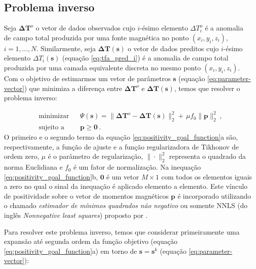 \subsection{Problema inverso}
\label{subsec:mag_dir_prob_inv}

Seja $\mathbf{\Delta T}^{o}$ o vetor de dados observados cujo $i$-ésimo elemento $\Delta T_{i}^{o}$ é a anomalia de campo total produzida por uma fonte magnética no ponto $(x_{i},y_{i},z_{i})$, $i = 1, \dots, N$. Similarmente, seja $\mathbf{\Delta T} (\mathbf{s})$ o vetor de dados preditos cujo $i$-ésimo elemento $\Delta T_{i}(\mathbf{s})$ (equação \ref{eq:tfa_pred_i}) é a anomalia de campo total produzida por uma camada equivalente discreta no mesmo ponto $(x_{i},y_{i},z_{i})$. Com o objetivo de estimarmos um vetor de parâmetros $\mathbf{s}$ (equação \ref{eq:parameter-vector}) que minimiza a diferença entre $\mathbf{\Delta T}^{o}$ e $\mathbf{\Delta T}(\mathbf{s})$, temos que resolver o problema inverso:

\begin{subequations}
	\begin{align}
	& \text{minimizar}
	& &\Psi(\mathbf{s}) =\lVert \mathbf{\Delta T}^{o} - \mathbf{\Delta T} (\mathbf{s}) 
	\rVert_{2}^{2} + \, \mu f_0 \parallel \mathbf{p} \parallel_{2}^{2} \: , \\
	& \text{sujeito a}
	& & \mathbf{p} \geqslant \mathbf{0} \: .
	\end{align}
	\label{eq:positivity_goal_function}
\end{subequations}
O primeiro e o segundo termo da equação \ref{eq:positivity_goal_function}a são, respectivamente, a função de ajuste e a função 
regularizadora de Tikhonov de ordem zero, $\mu$ é o parâmetro de regularização, $\| \cdot \|_{2}^{2}$ representa o quadrado da 
norma Euclidiana e $f_{0}$ é um fator de normalização. Na inequação \ref{eq:positivity_goal_function}b, $\mathbf{0}$ é um vetor 
$M \times 1$ com todos os elementos iguais a zero no qual o sinal da inequação é aplicado elemento a elemento. 
Este vínculo de positividade sobre o vetor de momentos magnéticos $\mathbf{p}$ é incorporado utilizando o chamado 
\textit{estimador de mínimos quadrados não negativo} ou somente NNLS (do inglês \textit{Nonnegative least squares}) proposto 
por \cite{lawson_hanson_1974}.

Para resolver este problema inverso, temos que considerar primeiramente uma expansão até segunda ordem da função objetivo 
(equação \ref{eq:positivity_goal_function}a) em torno de $\mathbf{s} = \mathbf{s}^{k}$ (equação \ref{eq:parameter-vector}):

